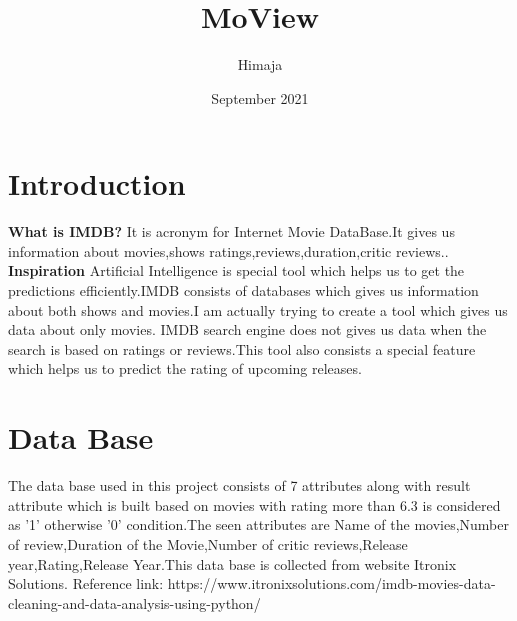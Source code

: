 \documentclass{article}
\title{MoView}
\author{Himaja }
\date{September 2021}
\begin{document}
\maketitle
\flushleft
\newpage
\section{Introduction}
\vspace{10pt}
\textbf{What is IMDB?} 
\vspace{5pt}
\newline 
It is acronym for Internet Movie DataBase.It gives us information about movies,shows ratings,reviews,duration,critic reviews..
\vspace{10pt}
\newline
\textbf{Inspiration}
\vspace{5pt}
\newline
Artificial Intelligence is special tool which helps us to get the predictions efficiently.IMDB consists of databases which gives us information about both shows and movies.I am actually trying to create a tool which gives us data about only movies.
\vspace{5pt}
\newline
IMDB search engine does not gives us data when the search is based on ratings or reviews.This tool also consists a special feature which helps us to predict the rating of upcoming releases. 
\section{Data Base}
\vspace{5pt}
The data base used in this project consists of 7 attributes along with result attribute which is built based on movies with rating more than 6.3 is considered as '1' otherwise '0' condition.The seen attributes are Name of the movies,Number of review,Duration of the Movie,Number of critic reviews,Release year,Rating,Release Year.This data base is collected from website Itronix Solutions.
\vspace{10pt}
\newline
Reference link:
https://www.itronixsolutions.com/imdb-movies-data-cleaning-and-data-analysis-using-python/
\end{document}
